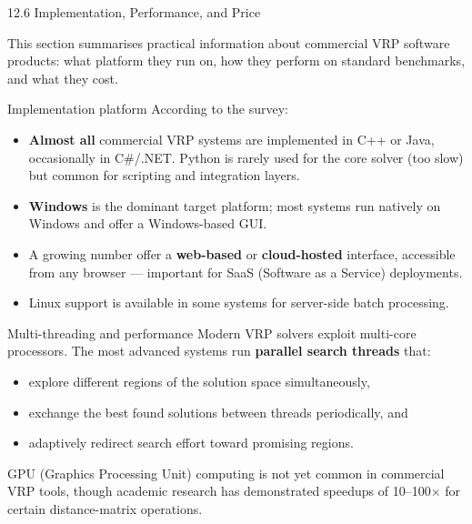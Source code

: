 \documentclass[aspectratio=169,10pt]{beamer}
\begin{document}
\begin{frame}[allowframebreaks]{12.6 \; Implementation, Performance, and Price}

  This section summarises practical information about commercial VRP software
  products: what platform they run on, how they perform on standard benchmarks,
  and what they cost.

  \begin{block}{Implementation platform}
    According to the survey:
    \begin{itemize}
      \item \textbf{Almost all} commercial VRP systems are implemented in
            C++ or Java, occasionally in C\#/.NET.
            Python is rarely used for the core solver (too slow) but common
            for scripting and integration layers.
      \item \textbf{Windows} is the dominant target platform; most systems
            run natively on Windows and offer a Windows-based GUI.
      \item A growing number offer a \textbf{web-based} or
            \textbf{cloud-hosted} interface, accessible from any
            browser --- important for SaaS (Software as a Service) deployments.
      \item Linux support is available in some systems for server-side
            batch processing.
    \end{itemize}
  \end{block}

  \begin{block}{Multi-threading and performance}
    Modern VRP solvers exploit multi-core processors.
    The most advanced systems run \textbf{parallel search threads} that:
    \begin{itemize}
      \item explore different regions of the solution space simultaneously,
      \item exchange the best found solutions between threads periodically,
            and
      \item adaptively redirect search effort toward promising regions.
    \end{itemize}
    GPU (Graphics Processing Unit) computing is not yet common in
    commercial VRP tools, though academic research has demonstrated speedups
    of 10--100$\times$ for certain distance-matrix operations.
  \end{block}

  \framebreak


\end{frame}
\end{document}
